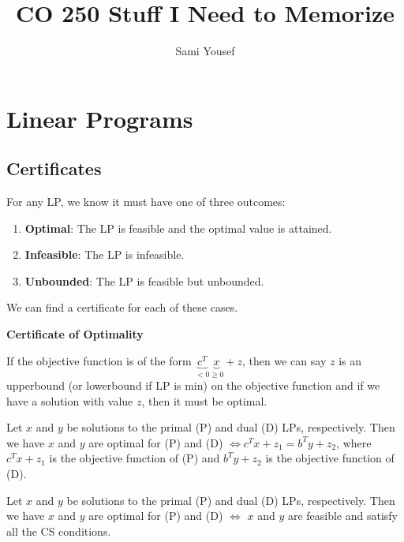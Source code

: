 \documentclass[a4paper]{report}
\author{Sami Yousef}
\title{CO 250 Stuff I Need to Memorize}
\begin{document}
	\maketitle

	\tableofcontents

	\chapter{Linear Programs}
	\section{Certificates}
	For any LP, we know it must have one of three outcomes:
	\begin{enumerate}
		\item \textbf{Optimal}: The LP is feasible and the optimal value is attained.

		\item \textbf{Infeasible}: The LP is infeasible.

		\item \textbf{Unbounded}: The LP is feasible but unbounded.
	\end{enumerate}

	We can find a certificate for each of these cases.

	\begin{definition*}
		\textbf{Certificate of Optimality} \item
		\begin{definition}
			\label{optimality:i} If the objective function is of the form $\underbrace{c^T}
			_{<0}\underbrace{x}_{\geq 0}+ z$, then we can say $z$ is an upperbound (or
			lowerbound if LP is min) on the objective function and if we have a
			solution with value $z$, then it must be optimal.
		\end{definition}

		\item
		\begin{definition}
			\label{optimality:ii} Let $x$ and $y$ be solutions to the primal (P) and dual
			(D) LPs, respectively. Then we have $x$ and $y$ are optimal for (P) and (D)
			$\Longleftrightarrow c^{T}x + z_{1} = b^{T}y + z_{2}$, where
			$c^{T}x + z_{1}$ is the objective function of (P) and $b^{T}y + z_{2}$ is
			the objective function of (D).
		\end{definition}

		\item
		\begin{definition}
			\label{optimality:iii} Let $x$ and $y$ be solutions to the primal (P) and dual
			(D) LPs, respectively. Then we have $x$ and $y$ are optimal for (P) and (D)
			$\Longleftrightarrow$ $x$ and $y$ are feasible and satisfy all the CS conditions.
		\end{definition}
	\end{definition*}
\end{document}
